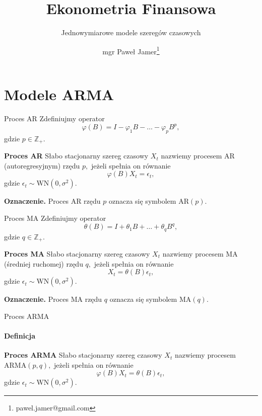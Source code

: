 \documentclass[a4paper, 11pt]{beamer}
\title{Ekonometria Finansowa}
\subtitle{Jednowymiarowe modele szeregów czasowych}
\author{mgr Paweł Jamer\thanks{pawel.jamer@gmail.com}}
\begin{document}
	\begin{frame}
		\titlepage
	\end{frame}
	
	\section{Modele ARMA}

	\begin{frame}{Proces AR}
		Zdefiniujmy operator \[
			\varphi\left(B\right) = I - \varphi_{1} B - \ldots - \varphi_{p} B^{p},
		\] gdzie $p \in \mathbb{Z}_{+}.$
		\begin{block}{\textbf{Proces AR}}
			Słabo stacjonarny szereg czasowy $X_t$ nazwiemy procesem AR (autoregresyjnym) rzędu $p,$ jeżeli spełnia on równanie \[
				\varphi\left(B\right) X_t = \epsilon_{t},
			\] gdzie $\epsilon_{t} \sim \mbox{WN}\left(0, \sigma^2\right).$
		\end{block}
		\begin{alert}{\textbf{Oznaczenie.}}
			Proces AR rzędu $p$ oznacza się symbolem $\mbox{AR}\left(p\right).$
		\end{alert}
	\end{frame}

	\begin{frame}{Proces MA}
		Zdefiniujmy operator \[
			\theta\left(B\right) = I + \theta_{1} B + \ldots +\theta_{q} B^{q},
		\] gdzie $q \in \mathbb{Z}_{+}.$
		\begin{block}{\textbf{Proces MA}}
			Słabo stacjonarny szereg czasowy $X_t$ nazwiemy procesem MA (średniej ruchomej) rzędu $q,$ jeżeli spełnia on równanie \[
				X_t = \theta\left(B\right) \epsilon_{t},
			\] gdzie $\epsilon_{t} \sim \mbox{WN}\left(0, \sigma^2\right).$
		\end{block}
		\begin{alert}{\textbf{Oznaczenie.}}
			Proces MA rzędu $q$ oznacza się symbolem $\mbox{MA}\left(q\right).$
		\end{alert}
	\end{frame}
	
	\begin{frame}{Proces ARMA}
		\framesubtitle{Definicja}
		\begin{block}{\textbf{Proces ARMA}}
			Słabo stacjonarny szereg czasowy $X_t$ nazwiemy procesem $\mbox{ARMA}\left(p, q\right),$ jeżeli spełnia on równanie \[
				\varphi\left(B\right) X_t = \theta\left(B\right) \epsilon_{t},
			\] gdzie $\epsilon_{t} \sim \mbox{WN}\left(0, \sigma^2\right).$
		\end{block}
	\end{frame}
	
\end{document}
